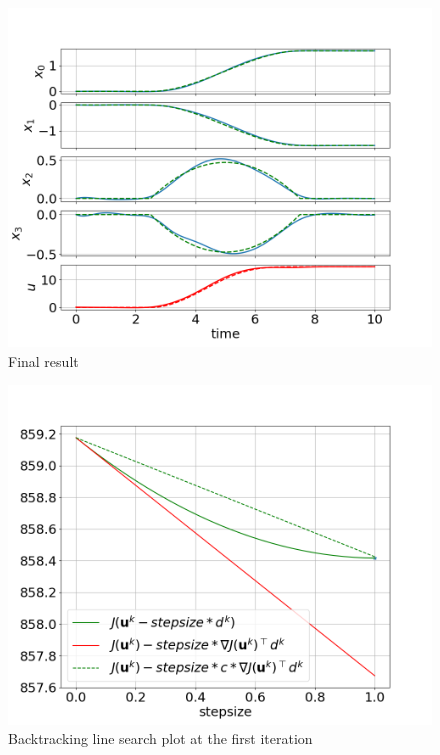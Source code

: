\begin{figure}
    \centering
    \includegraphics[width=0.8\linewidth]{figs/downward_f_smooth.png}
    \caption{Final result}
    \label{fig:downward_f_smooth}
\end{figure}

\begin{figure}
    \centering
    \includegraphics[width=0.8\linewidth]{figs/downward_armijio_0_smooth.png}
    \caption{Backtracking line search plot at the first iteration}
    \label{fig:downward_armijio_0_smooth}
\end{figure}

